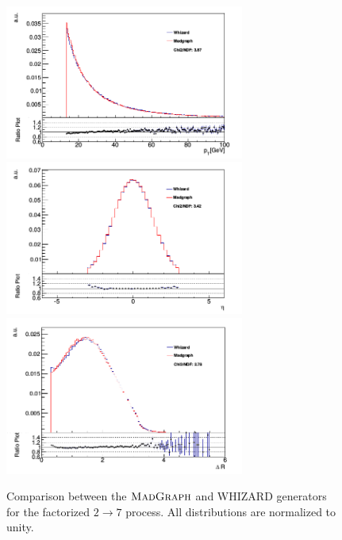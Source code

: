 \begin{figure} \label{fig-WHIZARDvsMADGRAPH}
\begin{center}
\includegraphics[width=0.7\textwidth]{Figures/WHIZARDvsMADGRAPHPT.png} \\
\includegraphics[width=0.7\textwidth]{Figures/WHIZARDvsMADGRAPHEta.png} \\
\includegraphics[width=0.7\textwidth]{Figures/WHIZARDvsMADGRAPHDR.png} \\
\caption{Comparison between the $\textsc{MadGraph}$ and WHIZARD generators for the factorized $2 \to 7$ process. All distributions are normalized to unity. \cite{ttgammasimulation}}
\end{center}
\end{figure}  


